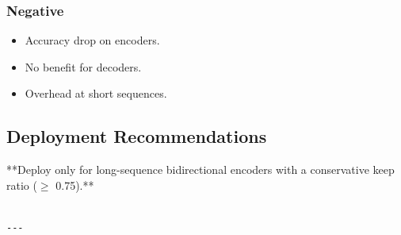 \subsubsection{Negative}

\begin{itemize}
\item Accuracy drop on encoders.
\item No benefit for decoders.
\item Overhead at short sequences.

\end{itemize}
\subsection{Deployment Recommendations}

**Deploy only for long-sequence bidirectional encoders with a conservative 
keep ratio ($\ge$ 0.75).**
\begin{lstlisting}

---
\end{lstlisting}